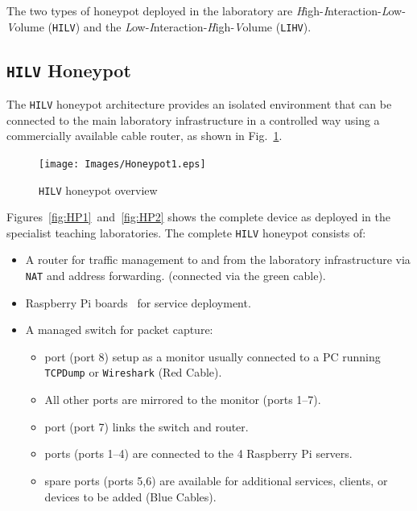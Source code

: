\documentclass[10pt,journal]{IEEEtran}
\begin{document}
The two types of honeypot deployed in the laboratory are
\emph{H}igh-\emph{I}nteraction-\emph{L}ow-\emph{V}olume (\texttt{HILV}) and the
\emph{L}ow-\emph{I}nteraction-\emph{H}igh-\emph{V}olume (\texttt{LIHV}).

\subsection{\texttt{HILV} Honeypot}

The \texttt{HILV} honeypot architecture provides an isolated environment that
can be connected to the main laboratory infrastructure in a controlled way
using a commercially available cable router, as shown in
Fig.~\ref{fig:HPOverview}.

\begin{figure}[!ht]
\begin{center}
	\texttt{[image: Images/Honeypot1.eps]}
\caption{\texttt{HILV} honeypot overview}
\label{fig:HPOverview}
\end{center}
\end{figure}

Figures~\ref{fig:HP1}~and~\ref{fig:HP2} shows the complete device as deployed
in the specialist teaching laboratories. The complete \texttt{HILV} honeypot
consists of:

\begin{itemize}
    \item \noindent A router for traffic management to and from the laboratory
      infrastructure via \texttt{NAT} and address forwarding. (connected via the
      green cable). 
    \item {} Raspberry Pi boards~\cite{RASP:17} for service deployment.
    \item \noindent A managed switch for packet capture:
    \begin{itemize}
        \item {} port (port 8) setup as a monitor usually connected to
          a PC running \texttt{TCPDump} or \texttt{Wireshark} (Red Cable).
        \item \noindent All other ports are mirrored to the monitor (ports
          1--7).
        \item {} port (port 7) links the switch and router.
        \item {} ports (ports 1--4) are connected to the 4 Raspberry Pi 
        servers.
        \item {} spare ports (ports 5,6) are available for additional
          services, clients, or devices to be added (Blue Cables).
    \end{itemize}
\end{itemize}
\end{document}
